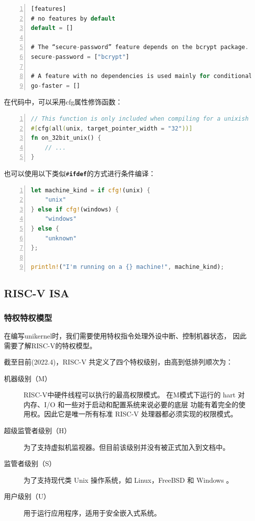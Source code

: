 \documentclass{../runikraft-report}
\begin{document}
\begin{lstlisting}[numbers=left,language=Rust]
[features]
# no features by default
default = []

# The “secure-password” feature depends on the bcrypt package.
secure-password = ["bcrypt"]

# A feature with no dependencies is used mainly for conditional compilation, like `#[cfg(feature = "go-faster")]`.
go-faster = []
\end{lstlisting}

在代码中，可以采用cfg属性修饰函数：
\begin{lstlisting}[numbers=left,language=Rust]
// This function is only included when compiling for a unixish OS with a 32-bit architecture
#[cfg(all(unix, target_pointer_width = "32"))]
fn on_32bit_unix() {
	// ...
}
\end{lstlisting}
也可以使用以下类似\texttt{\#\textbf{ifdef}}的方式进行条件编译：
\begin{lstlisting}[numbers=left,language=Rust]
let machine_kind = if cfg!(unix) {
	"unix"
} else if cfg!(windows) {
	"windows"
} else {
	"unknown"
};

println!("I'm running on a {} machine!", machine_kind);
\end{lstlisting}
\cite{e}

\subsection{RISC-V ISA}
\subsubsection{特权特权模型}
在编写unikernel时，我们需要使用特权指令处理外设中断、控制机器状态，
因此需要了解RISC-V的特权模型。

截至目前(2022.4)，RISC-V 共定义了四个特权级别，由高到低排列顺次为：

\begin{description}
\item[机器级别（M）] RISC-V中硬件线程可以执行的最高权限模式。
在M模式下运行的 hart 对内存、I/O 和一些对于启动和配置系统来说必要的底层
功能有着完全的使用权。因此它是唯一所有标准 RISC-V 处理器都必须实现的权限模式。\cite{a}
\item[超级监管者级别（H）] 为了支持虚拟机监视器。但目前该级别并没有被正式加入到文档中。
\item[监管者级别（S）] 为了支持现代类 Unix 操作系统，如 Linux，FreeBSD 和 Windows 。
\item[用户级别（U）] 用于运行应用程序，适用于安全嵌入式系统。
\end{description}
\end{document}
